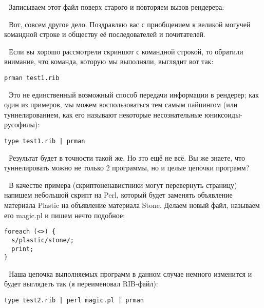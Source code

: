 
  Записываем этот файл поверх старого и повторяем
    вызов рендерера:


  Вот, совсем другое дело. Поздравляю вас с
    приобщением к великой могучей командной строке и обществу её
    последователей и почитателей.

  Если вы хорошо рассмотрели скриншот с командной
    строкой, то обратили внимание, что команда, которую мы выполняли,
    выглядит вот так:

\begin{lstlisting}[frame=single, framerule=0pt, framesep=10pt, xleftmargin=10pt, xrightmargin=10pt, basicstyle=\ttfamily \small, backgroundcolor=\color{light-gray}]
prman test1.rib
\end{lstlisting}

  Это не единственный возможный способ передачи
    информации в рендерер; как один из примеров, мы можем
    воспользоваться тем самым пайпингом (или туннелированием, как его
    называют некоторые несознательные юниксоиды-русофилы):

\begin{lstlisting}[frame=single, framerule=0pt, framesep=10pt, xleftmargin=10pt, xrightmargin=10pt, basicstyle=\ttfamily \small, backgroundcolor=\color{light-gray}]
type test1.rib | prman
\end{lstlisting}

  Результат будет в точности такой же. Но это ещё не
    всё. Вы же знаете, что туннелировать можно не только 2 программы,
    но и целые цепочки программ?

  В качестве примера (скриптоненавистники могут
    перевернуть страницу) напишем небольшой скрипт на Perl, который
    будет заменять объявление материала Plastic на объявление материала
    Stone. Делаем новый файл, называем его magic.pl и пишем нечто
    подобное:

\begin{lstlisting}[frame=single, framerule=0pt, framesep=10pt, xleftmargin=10pt, xrightmargin=10pt, basicstyle=\ttfamily \small, backgroundcolor=\color{light-gray}]
foreach (<>) {
  s/plastic/stone/;
  print;
}
\end{lstlisting}
  
Наша цепочка выполняемых программ в данном случае
    немного изменится и будет выглядеть так (я переименовал
    RIB-файл):

\begin{lstlisting}[frame=single, framerule=0pt, framesep=10pt, xleftmargin=10pt, xrightmargin=10pt, basicstyle=\ttfamily \small, backgroundcolor=\color{light-gray}]
type test2.rib | perl magic.pl | prman
\end{lstlisting}
  
